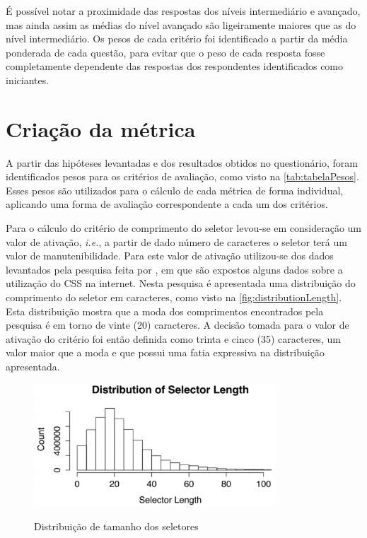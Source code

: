 É possível notar a proximidade das respostas dos níveis intermediário e avançado, mas ainda assim as médias do nível avançado são ligeiramente maiores que as do nível intermediário. Os pesos de cada critério foi identificado a partir da média ponderada de cada questão, para evitar que o peso de cada resposta fosse completamente dependente das respostas dos respondentes identificados como iniciantes.

\section{Criação da métrica}
	
A partir das hipóteses levantadas e dos resultados obtidos no questionário, foram identificados pesos para os critérios de avaliação, como visto na \autoref{tab:tabelaPesos}. Esses pesos são utilizados para o cálculo de cada métrica de forma individual, aplicando uma forma de avaliação correspondente a cada um dos critérios.




Para o cálculo do critério de comprimento do seletor levou-se em consideração um valor de ativação, \textit{i.e.}, a partir de dado número de caracteres o seletor terá um valor de manutenibilidade. Para este valor de ativação utilizou-se dos dados levantados pela pesquisa feita por , em que são expostos alguns dados sobre a utilização do CSS na internet. Nesta pesquisa é apresentada uma distribuição do comprimento do seletor em caracteres, como visto na \autoref{fig:distributionLength}. Esta distribuição mostra que a moda dos comprimentos encontrados pela pesquisa é em torno de vinte (20) caracteres. A decisão tomada para o valor de ativação do critério foi então definida como trinta e cinco (35) caracteres, um valor maior que a moda e que possui uma fatia expressiva na distribuição apresentada.

\begin{figure}[!htb]
	\centering
	\caption{Distribuição de tamanho dos seletores}
	\includegraphics[width=0.8\textwidth]{./04-figuras/dist_selectorL}
	\label{fig:distributionLength}
\end{figure}

